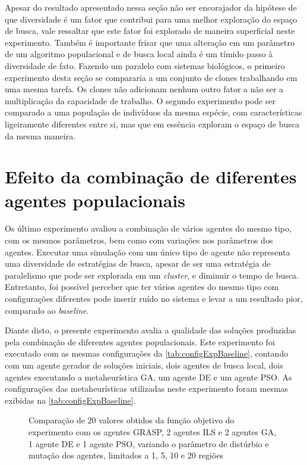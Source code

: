 Apesar do resultado apresentado nessa seção não ser encorajador da hipótese de que diversidade é um fator que contribui para uma melhor exploração do espaço de busca, vale ressaltar que este fator foi explorado de maneira superficial neste experimento. Também é importante frisar que uma alteração em um parâmetro de um algoritmo populacional e de busca local ainda é um tímido passo à diversidade de fato. Fazendo um paralelo com sistemas biológicos, o primeiro experimento desta seção se compararia a um conjunto de clones trabalhando em uma mesma tarefa. Os clones não adicionam nenhum outro fator a não ser a multiplicação da capacidade de trabalho. O segundo experimento pode ser comparado a uma população de indivíduos da mesma espécie, com características ligeiramente diferentes entre si, mas que em essência exploram o espaço de busca da mesma maneira. 

\section{Efeito da combinação de diferentes agentes populacionais} 
\label{sec:diversidade}

Os último experimento avaliou a combinação de vários agentes do mesmo tipo, com os mesmos parâmetros, bem como com variações nos parâmetros dos agentes.  Executar  uma simulação com um único tipo de agente não representa uma diversidade de estratégias de busca, apesar de ser uma estratégia de paralelismo que pode ser explorada em um \textit{cluster}, e diminuir o tempo de busca. Entretanto, foi possível perceber que ter vários agentes do mesmo tipo com configurações diferentes pode inserir ruído no sistema e levar a um resultado pior, comparado ao \textit{baseline}. 

Diante disto, o presente experimento avalia a qualidade das soluções produzidas pela combinação de diferentes agentes populacionais. Este experimento foi executado com as mesmas configurações da \autoref{tab:configExpBaseline}, contando com um agente gerador de soluções iniciais, dois agentes de busca local, dois agentes executando a metaheurística GA, um agente DE e um agente PSO. As configurações das metaheurísticas utilizadas neste experimento foram mesmas exibidas na \autoref{tab:configExpBaseline}.

\begin{figure}
    \centering
    \caption{Comparação de 20 valores obtidos da função objetivo do experimento com os agentes GRASP, 2 agentes ILS e 2 agentes GA, 1 agente DE e 1 agente PSO, variando o parâmetro de distúrbio e mutação dos agentes, limitados a 1, 5, 10 e 20 regiões}
    
    \label{fig:A03boxplot}
\end{figure}

